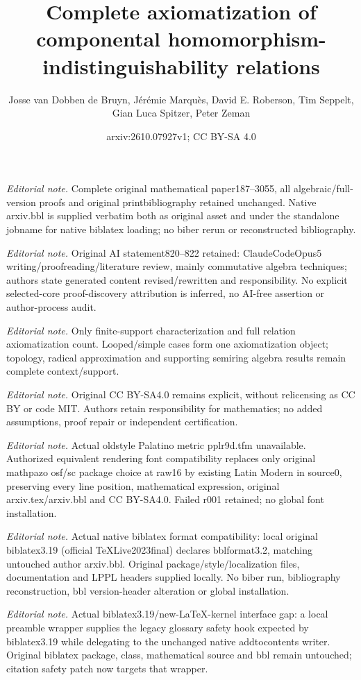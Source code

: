 \documentclass[11pt]{scrartcl}
\title{Complete axiomatization of componental homomorphism-indistinguishability relations}
\author{Josse van Dobben de Bruyn, Jérémie Marquès, David E. Roberson, Tim Seppelt, Gian Luca Spitzer, Peter Zeman}
\date{arxiv:2610.07927v1; CC BY-SA 4.0}
\theoremstyle{definition}
\theoremstyle{plain}
\theoremstyle{remark}
\begin{document}
\maketitle
\noindent\textit{Editorial note.} Complete original mathematical paper187--3055, all algebraic/full-version proofs and original printbibliography retained unchanged. Native arxiv.bbl is supplied verbatim both as original asset and under the standalone jobname for native biblatex loading; no biber rerun or reconstructed bibliography.\par\medskip
\noindent\textit{Editorial note.} Original AI statement820--822 retained: ClaudeCodeOpus5 writing/proofreading/literature review, mainly commutative algebra techniques; authors state generated content revised/rewritten and responsibility. No explicit selected-core proof-discovery attribution is inferred, no AI-free assertion or author-process audit.\par\medskip
\noindent\textit{Editorial note.} Only finite-support characterization and full relation axiomatization count. Looped/simple cases form one axiomatization object; topology, radical approximation and supporting semiring algebra results remain complete context/support.\par\medskip
\noindent\textit{Editorial note.} Original CC BY-SA4.0 remains explicit, without relicensing as CC BY or code MIT. Authors retain responsibility for mathematics; no added assumptions, proof repair or independent certification.\par\medskip
\noindent\textit{Editorial note.} Actual oldstyle Palatino metric pplr9d.tfm unavailable. Authorized equivalent rendering font compatibility replaces only original mathpazo osf/sc package choice at raw16 by existing Latin Modern in source0, preserving every line position, mathematical expression, original arxiv.tex/arxiv.bbl and CC BY-SA4.0. Failed r001 retained; no global font installation.\par\medskip
\noindent\textit{Editorial note.} Actual native biblatex format compatibility: local original biblatex3.19 (official TeXLive2023final) declares bblformat3.2, matching untouched author arxiv.bbl. Original package/style/localization files, documentation and LPPL headers supplied locally. No biber run, bibliography reconstruction, bbl version-header alteration or global installation.\par\medskip
\noindent\textit{Editorial note.} Actual biblatex3.19/new-LaTeX-kernel interface gap: a local preamble wrapper supplies the legacy glossary safety hook expected by biblatex3.19 while delegating to the unchanged native addtocontents writer. Original biblatex package, class, mathematical source and bbl remain untouched; citation safety patch now targets that wrapper.\par\medskip
\end{document}
